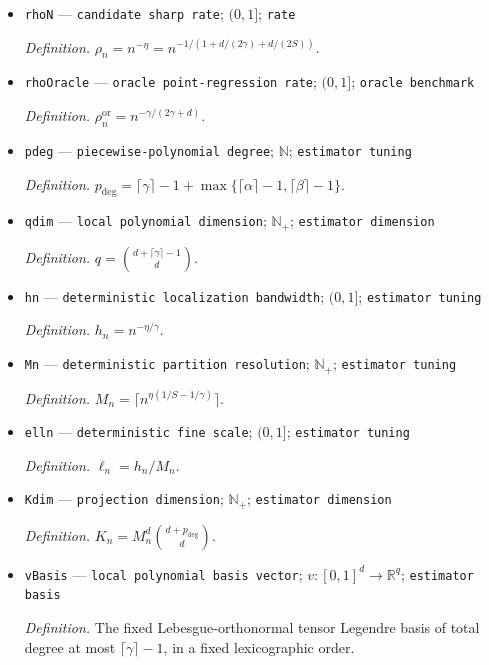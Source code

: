 \documentclass{article}
\begin{document}
\begin{itemize}
  \par\smallskip\noindent\emph{Definition.} The class \(\mathcal P(d,\alpha,\beta,\gamma,L)\) constructed in \(\mathrm{def:exact\mbox{-}model}\).
  \item \texttt{rhoN} --- \texttt{candidate sharp rate}; \((0,1]\); \texttt{rate}
  \par\smallskip\noindent\emph{Definition.} \(\rho_n=n^{-\eta}=n^{-1/(1+d/(2\gamma)+d/(2S))}\).
  \item \texttt{rhoOracle} --- \texttt{oracle point-\allowbreak{}regression rate}; \((0,1]\); \texttt{oracle benchmark}
  \par\smallskip\noindent\emph{Definition.} \(\rho_n^{\mathrm{or}}=n^{-\gamma/(2\gamma+d)}\).
  \item \texttt{pdeg} --- \texttt{piecewise-\allowbreak{}polynomial degree}; \(\mathbb N\); \texttt{estimator tuning}
  \par\smallskip\noindent\emph{Definition.} \(p_{\mathrm{deg}}=\lceil\gamma\rceil-1+\max\{\lceil\alpha\rceil-1,\lceil\beta\rceil-1\}\).
  \item \texttt{qdim} --- \texttt{local polynomial dimension}; \(\mathbb N_{+}\); \texttt{estimator dimension}
  \par\smallskip\noindent\emph{Definition.} \(q=\binom{d+\lceil\gamma\rceil-1}{d}\).
  \item \texttt{hn} --- \texttt{deterministic localization bandwidth}; \((0,1]\); \texttt{estimator tuning}
  \par\smallskip\noindent\emph{Definition.} \(h_n=n^{-\eta/\gamma}\).
  \item \texttt{Mn} --- \texttt{deterministic partition resolution}; \(\mathbb N_{+}\); \texttt{estimator tuning}
  \par\smallskip\noindent\emph{Definition.} \(M_n=\lceil n^{\eta(1/S-1/\gamma)}\rceil\).
  \item \texttt{elln} --- \texttt{deterministic fine scale}; \((0,1]\); \texttt{estimator tuning}
  \par\smallskip\noindent\emph{Definition.} \(\ell_n=h_n/M_n\).
  \item \texttt{Kdim} --- \texttt{projection dimension}; \(\mathbb N_{+}\); \texttt{estimator dimension}
  \par\smallskip\noindent\emph{Definition.} \(K_n=M_n^d\binom{d+p_{\mathrm{deg}}}{d}\).
  \item \texttt{vBasis} --- \texttt{local polynomial basis vector}; \(v:[0,1]^d\to\mathbb R^q\); \texttt{estimator basis}
  \par\smallskip\noindent\emph{Definition.} The fixed Lebesgue-orthonormal tensor Legendre basis of total degree at most \(\lceil\gamma\rceil-1\), in a fixed lexicographic order.

\end{itemize}
\end{document}
